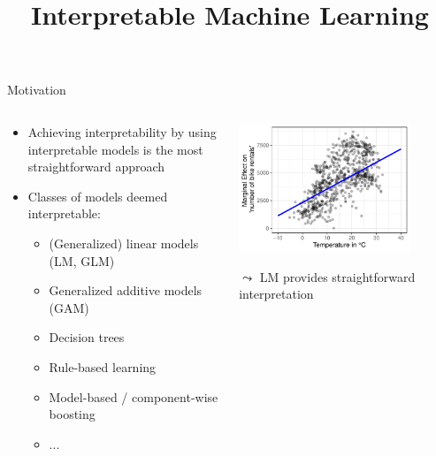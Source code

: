 \documentclass[10pt,compress,t,notes=noshow, xcolor=table]{beamer}
\title{Interpretable Machine Learning}
\date{}
\begin{document}
 



\begin{frame}{Motivation}
\begin{columns}[T, totalwidth = \textwidth]
    \begin{column}{0.58\textwidth}
    \begin{itemize}
       \item Achieving interpretability by using interpretable models is the most straightforward approach
         \item Classes of models deemed interpretable:
   \begin{itemize}
  \footnotesize
  \item (Generalized) linear models (LM, GLM)
  \item Generalized additive models (GAM)
  \item Decision trees
  \item Rule-based learning
  \item Model-based / component-wise boosting
  \item ...
\end{itemize}
    \end{itemize}
    

    \end{column}
    \begin{column}{0.42\textwidth}  %
    \centering
  \includegraphics[width = 0.8\textwidth]{figure/main_effect_lm_temp.pdf}
  \begin{center}
    $\leadsto$ LM provides straightforward interpretation
  \end{center}


\end{column}
\end{columns}
\end{frame}
\end{document}
